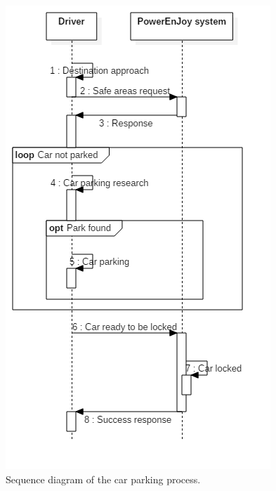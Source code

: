 \begin{figure}[H]
	\begin{center}
		\centering
		\includegraphics[height=0.9\textheight, keepaspectratio]{sequence_diagram/Park.png}
		\caption{Sequence diagram of the car parking process.}
	\end{center}
\end{figure}


